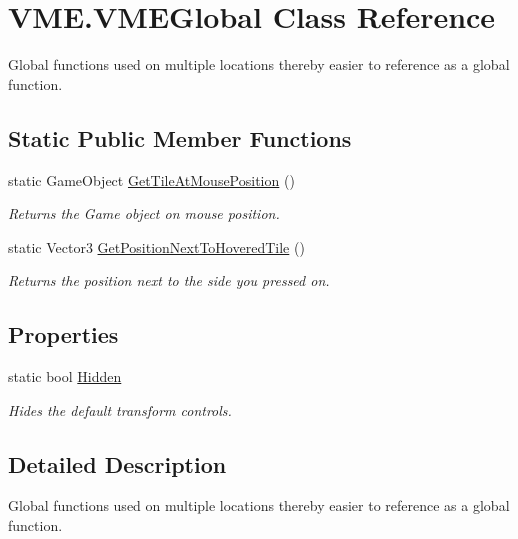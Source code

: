 \hypertarget{class_v_m_e_1_1_v_m_e_global}{}\section{V\+M\+E.\+V\+M\+E\+Global Class Reference}
\label{class_v_m_e_1_1_v_m_e_global}


Global functions used on multiple locations thereby easier to reference as a global function.  


\subsection*{Static Public Member Functions}
\begin{DoxyCompactItemize}
\item 
static Game\+Object \hyperlink{class_v_m_e_1_1_v_m_e_global_a671e5f258b3eb4bcadf664c167c3e79f}{Get\+Tile\+At\+Mouse\+Position} ()
\begin{DoxyCompactList}\small\item\em Returns the Game object on mouse position. \end{DoxyCompactList}\item 
static Vector3 \hyperlink{class_v_m_e_1_1_v_m_e_global_a69d7a0fa793e299c8abcd21f2cdfe4f5}{Get\+Position\+Next\+To\+Hovered\+Tile} ()
\begin{DoxyCompactList}\small\item\em Returns the position next to the side you pressed on. \end{DoxyCompactList}\end{DoxyCompactItemize}
\subsection*{Properties}
\begin{DoxyCompactItemize}
\item 
static bool \hyperlink{class_v_m_e_1_1_v_m_e_global_ae53c2b25ceae18d5585ced3817c65e20}{Hidden}
\begin{DoxyCompactList}\small\item\em Hides the default transform controls. \end{DoxyCompactList}\end{DoxyCompactItemize}


\subsection{Detailed Description}
Global functions used on multiple locations thereby easier to reference as a global function. 



